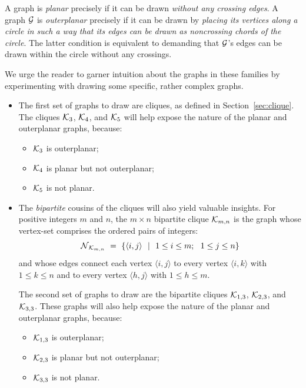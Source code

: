 \noindent
A graph is {\it planar}  precisely if it can be drawn {\em without any crossing edges}.
A graph $\mbox{$\cal G$}$ is {\it outerplanar} precisely if it can be drawn by {\em placing its vertices along a circle
in such a way that its edges can be drawn as noncrossing chords of the circle}.  The latter condition is
equivalent to demanding that $\mbox{$\cal G$}$'s edges can be drawn within the circle without any crossings.

We urge the reader to garner intuition about the graphs in these
families by experimenting with drawing some specific, rather complex graphs.
\begin{itemize}
\item
The first set of graphs to draw are cliques, as defined in
Section~\ref{sec:clique}.  The cliques $\mbox{$\cal K$}_3$, $\mbox{$\cal K$}_4$, and
$\mbox{$\cal K$}_5$ will help expose the nature of the planar and outerplanar
graphs, because:
  \begin{itemize}
  \item
$\mbox{$\cal K$}_3$ is outerplanar; 
  \item
$\mbox{$\cal K$}_4$ is planar but not outerplanar;
  \item
$\mbox{$\cal K$}_5$ is not planar.
  \end{itemize}

\item
The {\em bipartite} cousins of the cliques will also yield valuable insights.  For positive 
integers $m$ and $n$, the $m \times n$ bipartite clique $\mbox{$\cal K$}_{m,n}$ is the graph
whose vertex-set comprises the ordered pairs of integers:
\[  \mbox{$\cal N$}_{\mbox{{\scriptsize $\cal K$}}_{m,n}} \ = \
\{ \langle i,j \rangle \ \ | \ \ 1 \leq i \leq m; \ \ 1 \leq j \leq n\}
\]
and whose edges connect each vertex $\langle i,j \rangle$ to every vertex
$\langle i,k \rangle$ with $1 \leq k \leq n$ and to every vertex
$\langle h,j \rangle$ with $1 \leq h \leq m$.

The second set of graphs to draw are the bipartite cliques $\mbox{$\cal K$}_{1,3}$,
$\mbox{$\cal K$}_{2,3}$, and $\mbox{$\cal K$}_{3,3}$.  These graphs will also help expose the
nature of the planar and outerplanar graphs, because:
  \begin{itemize}
  \item
$\mbox{$\cal K$}_{1,3}$ is outerplanar; 
  \item
$\mbox{$\cal K$}_{2,3}$ is planar but not outerplanar;
  \item
$\mbox{$\cal K$}_{3,3}$ is not planar.
  \end{itemize}
\end{itemize}

